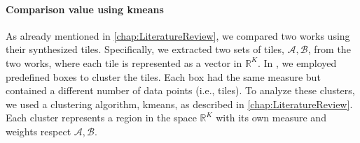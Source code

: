 \paragraph{Comparison value using \gls{kmeans}}
\begin{modified} As already mentioned in \cref{chap:LiteratureReview}, we compared two works using their synthesized tiles. Specifically, we extracted two sets of tiles, $\mathcal{A},\mathcal{B}$, from the two works, where each tile is represented as a vector in $\mathbb{R}^K$. In \cite{thesis}, we employed predefined boxes to cluster the tiles. Each box had the same measure but contained a different number of data points (i.e., tiles). To analyze these clusters, we used a clustering algorithm, \gls{kmeans}, as described in \cref{chap:LiteratureReview}. Each cluster represents a region in the space $\mathbb{R}^K$ with its own measure and weights respect $\mathcal{A}, \mathcal{B}$.


\end{modified}
